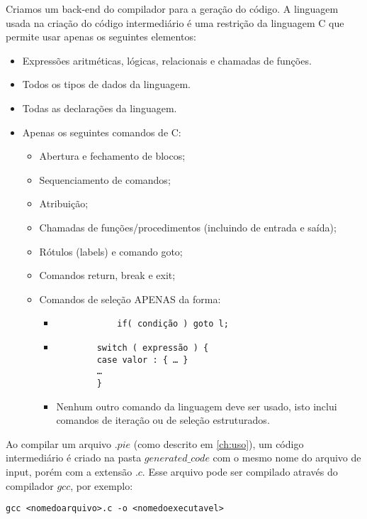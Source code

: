 
Criamos um back-end do compilador para a geração do código. 
A linguagem usada na criação do código intermediário é uma restrição da linguagem C que permite usar apenas os seguintes elementos:
\begin{itemize}
	\item Expressões aritméticas, lógicas, relacionais e chamadas de funções.
	\item Todos os tipos de dados da linguagem.
	\item Todas as declarações da linguagem.
	\item Apenas os seguintes comandos de C:
	\begin{itemize}
		\item Abertura e fechamento de blocos;
		\item Sequenciamento de comandos;
		\item Atribuição;
		\item Chamadas de funções/procedimentos (incluindo de entrada e saída);
		\item Rótulos (labels) e comando goto;
		\item Comandos return, break e exit;
		\item Comandos de seleção APENAS da forma:
		\begin{itemize}
			\item \begin{verbatim}
			if( condição ) goto l;
			\end{verbatim}
			\item \begin{verbatim}
		switch ( expressão ) {
		case valor : { … }
		…
		}
		\end{verbatim}
		\item Nenhum outro comando da linguagem deve ser usado, isto inclui comandos de iteração ou de
		seleção estruturados.
		\end{itemize}
	\end{itemize}
\end{itemize}

Ao compilar um arquivo $.pie$ (como descrito em \ref{ch:uso}), um código intermediário é criado na pasta $generated\_code$ com o mesmo nome do arquivo de input, porém com a extensão $.c$. Esse arquivo pode ser compilado através do compilador $gcc$, por exemplo:
\begin{verbatim}
gcc <nomedoarquivo>.c -o <nomedoexecutavel>
\end{verbatim}
